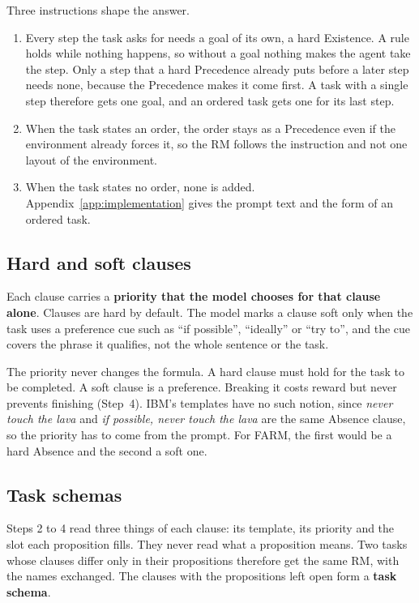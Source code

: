 \documentclass[11pt,english,listoffigures,listoftables]{tfgetsinf}
\begin{document}
Three instructions shape the answer. 
\begin{enumerate}
    \item Every step the task asks for needs a goal of its own, a hard Existence. A rule holds while nothing happens, so without a goal nothing makes the agent take the step. Only a step that a hard Precedence already puts before a later step needs none, because the Precedence makes it come first. A task with a single step therefore gets one goal, and an ordered task gets one for its last step.
    \item When the task states an order, the order stays as a Precedence even if the environment already forces it, so the RM follows the instruction and not one layout of the environment.
    \item When the task states no order, none is added. Appendix~\ref{app:implementation} gives the prompt text and the form of an ordered task.
\end{enumerate}

\subsection{Hard and soft clauses}
Each clause carries a \textbf{priority that the model chooses for that clause alone}. Clauses are hard by default. The model marks a clause soft only when the task uses a preference cue such as ``if possible'', ``ideally'' or ``try to'', and the cue covers the phrase it qualifies, not the whole sentence or the task. 

The priority never changes the formula. A hard clause must hold for the task to be completed. A soft clause is a preference. Breaking it costs reward but never prevents finishing (Step~4). IBM's templates have no such notion, since \textit{never touch the lava} and \textit{if possible, never touch the lava} are the same Absence clause, so the priority has to come from the prompt. For FARM, the first would be a hard Absence and the second a soft one.

\subsection{Task schemas}
\label{sec:task-schemas}
Steps 2 to 4 read three things of each clause: its template, its priority and the slot each proposition fills. They never read what a proposition means. Two tasks whose clauses differ only in their propositions therefore get the same RM, with the names exchanged. The clauses with the propositions left open form a \textbf{task schema}.
\end{document}
